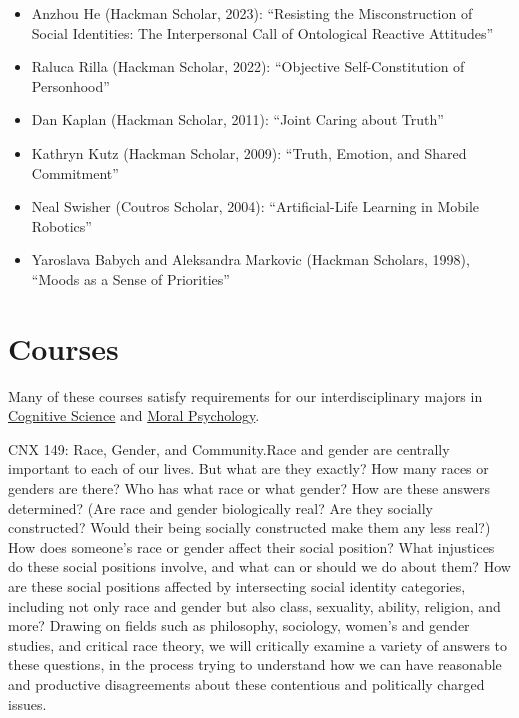 \documentclass[%
  11pt,%
]{article}
\begin{document}
\begin{itemize}

  \item Anzhou He (Hackman Scholar, 2023): \enquote{Resisting the Misconstruction of Social Identities: The Interpersonal Call of Ontological Reactive Attitudes}
  \item Raluca Rilla (Hackman Scholar, 2022): \enquote{Objective Self-Constitution of Personhood}
  \item Dan Kaplan (Hackman Scholar, 2011): \enquote{Joint Caring about Truth}
  \item Kathryn Kutz (Hackman Scholar, 2009): \enquote{Truth, Emotion, and Shared Commitment}
  \item Neal Swisher (Coutros Scholar, 2004): \enquote{Artificial-Life Learning in Mobile Robotics}
  \item Yaroslava Babych and Aleksandra Markovic (Hackman Scholars, 1998), \enquote{Moods as a Sense of Priorities}

\end{itemize}

\section{Courses}

Many of these courses satisfy requirements for our interdisciplinary majors in \href{https://www.fandm.edu/fields-of-study/cognitive-science/index.html}{Cognitive Science} and \href{https://www.fandm.edu/fields-of-study/moral-psychology/index.html}{Moral Psychology}.
\medskip{}

\begin{htmlcourse}{CNX 149: Race, Gender, and Community.}{Race and gender are centrally important to each of our lives. But what are they exactly? How many races or genders are there? Who has what race or what gender? How are these answers determined? (Are race and gender biologically real? Are they socially constructed? Would their being socially constructed make them any less real?) How does someone's race or gender affect their social position? What injustices do these social positions involve, and what can or should we do about them? How are these social positions affected by intersecting social identity categories, including not only race and gender but also class, sexuality, ability, religion, and more? Drawing on fields such as philosophy, sociology, women's and gender studies, and critical race theory, we will critically examine a variety of answers to these questions, in the process trying to understand how we can have reasonable and productive disagreements about these contentious and politically charged issues.}\end{htmlcourse}
\end{document}
